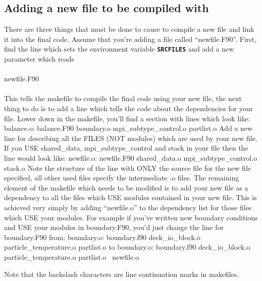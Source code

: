 \documentclass[12pt,a4paper]{article}
\newcommand{\inlinecode}[1]{{\color{warwickred} \bf\texttt{#1}}}
\newcommand{\EPOCH}{{\color{warwickdark}\fontfamily{phv}\selectfont{EPOCH}}}
\newenvironment{boxverbatim}{\lboxverbatim{none}}{\endlboxverbatim}
\begin{document}
\subsection{Adding a new file to be compiled with {\EPOCH}}
There are three things that must be done to cause {\EPOCH} to compile a new
file and link it into the final code. Assume that you're adding a file called
``newfile.F90''. First, find the line which sets the environment variable
\inlinecode{SRCFILES} and add a new parameter which reads\\
\\
newfile.F90\\
\\ This tells the makefile to compile the final code using your new file, the
next thing to do is to add a line which tells the code about the dependencies
for your file. Lower down in the makefile, you'll find a section with lines
which look like:
\begin{boxverbatim}
balance.o: balance.F90 boundary.o mpi_subtype_control.o partlist.o
\end{boxverbatim}
Add a new line for describing all the FILES (NOT modules) which are used by
your new file. If you USE shared\_data, mpi\_subtype\_control and stack in
your file then the line would look like:
\begin{boxverbatim}
newfile.o: newfile.F90 shared_data.o mpi_subtype_control.o stack.o
\end{boxverbatim}
Note the structure of the line with ONLY the source file for the new file
specified, all other used files specify the intermediate .o files. The
remaining element of the makefile which needs to be modified is to add your
new file as a dependency to all the files which USE modules contained in your
new file. This is achieved very simply by adding ``newfile.o'' to the dependency
list for those files which USE your modules. For example if you've written new
boundary conditions and USE your modules in boundary.F90, you'd just change
the line for boundary.F90 from:
\begin{boxverbatim}
boundary.o: boundary.f90 deck_io_block.o particle_temperature.o partlist.o
\end{boxverbatim}
to
\begin{boxverbatim}
boundary.o: boundary.f90 deck_io_block.o particle_temperature.o partlist.o \
  newfile.o
\end{boxverbatim}

Note that the backslash characters are line continuation marks in makefiles.
\end{document}
